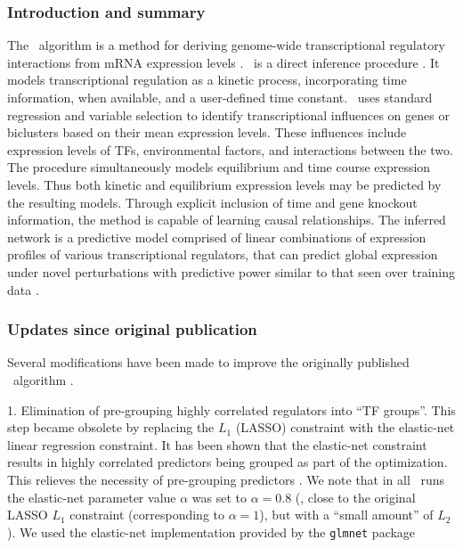 \subsubsection{Introduction and summary}

The \nwinf\ algorithm is a method for deriving
genome-wide transcriptional regulatory interactions from mRNA
expression levels \cite{Bonneau2006}. \nwinf\ is a direct inference
procedure \cite{Michoel2009}. It models transcriptional regulation
as a kinetic process, incorporating time information, when available,
and a user-defined time constant. \nwinf\ uses standard regression and
variable selection to identify transcriptional influences on genes or
biclusters based on their mean expression levels. These influences include expression
levels of TFs, environmental factors, and interactions between the two. The procedure
simultaneously models equilibrium and time course expression levels. Thus both kinetic and equilibrium expression levels may be
predicted by the resulting models. Through  explicit inclusion of
time and gene knockout information, the method is capable of learning
causal relationships. The inferred network is a predictive model
comprised of linear combinations of expression profiles of various
transcriptional regulators, that can predict global expression under
novel perturbations with predictive power similar to that seen over
training data \cite{Bonneau2006}.

\subsubsection{Updates since original publication}

Several modifications have been made to improve the originally published \nwinf\ algorithm \cite{Bonneau2006}. 

1. Elimination of pre-grouping highly correlated regulators
into ``TF groups''. This step became obsolete
by replacing the $L_1$ (LASSO) constraint with the elastic-net
linear regression constraint. It has been shown that the elastic-net
constraint results in highly correlated predictors being grouped as
part of the optimization. This relieves the necessity of pre-grouping
predictors \cite{Zou05regularizationand}. We note that in
all \nwinf\ runs the elastic-net parameter value $\alpha$ was set to
$\alpha=0.8$ (\ie, close to the original LASSO $L_1$ constraint
(corresponding to $\alpha=1$), but with a ``small amount'' of
$L_2$). We used the elastic-net implementation provided by
the  \texttt{glmnet}
package \cite{Friedman:Hastie:Tibshirani:2009:JSSOBK:v33i01}

